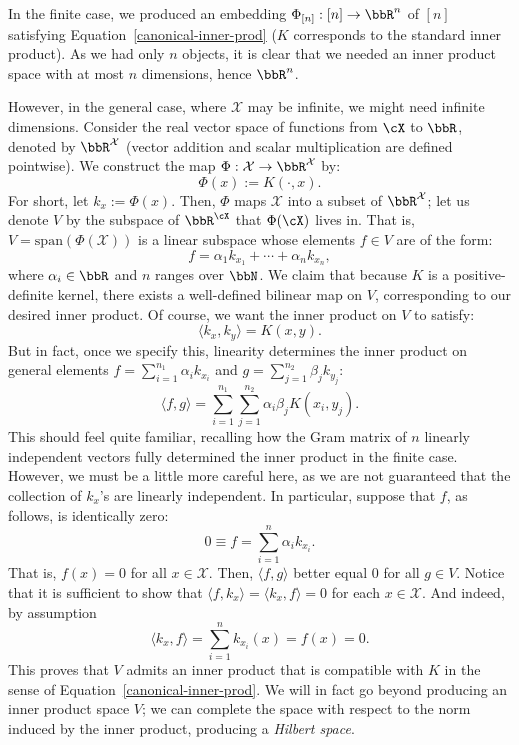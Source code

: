 \documentclass[twoside,11pt]{homework}
\begin{document}
\begin{multicols}{2}
In the finite case, we produced an embedding $\Phi_{[n]} : [n] \to \bbR^n$ of $[n]$
satisfying Equation~\ref{canonical-inner-prod} ($K$ corresponds to the standard
inner product). As we had only $n$ objects, it is clear that we needed an inner
product space with at most $n$ dimensions, hence $\bbR^n$.

However, in the general case, where $\mathcal{X}$ may be infinite, we might need
infinite dimensions. Consider the real vector space of functions from $\cX$ to $\bbR$,
denoted by $\bbR^\mathcal{X}$ (vector addition
and scalar multiplication are defined pointwise). We construct the map
$\Phi: \mathcal{X} \to \bbR^\mathcal{X}$ by:
\[\Phi(x) :=K(\cdot, x).\]
For short, let $k_x := \Phi(x)$. Then, $\Phi$ maps $\mathcal{X}$ into a subset of
$\bbR^\mathcal{X}$; let us denote $V$ by the subspace of $\bbR^\cX$ that $\Phi(\cX)$
lives in. That is, $V = \mathrm{span}(\Phi(\mathcal{X}))$ is a linear subspace
whose elements $f \in V$ are of the form:
\[f= \alpha_1k_{x_1} + \dotsm + \alpha_n k_{x_n},\]
where $\alpha_i \in \bbR$ and $n$ ranges over $\bbN$. We claim that because $K$ is a positive-definite kernel, there exists a well-defined bilinear map on $V$, corresponding to our desired inner product. Of course, we want the inner product on $V$ to satisfy:
\[\langle k_x, k_y\rangle = K(x,y).\]
But in fact, once we specify this, linearity determines the inner product on general elements $f = \sum_{i=1}^{n_1} \alpha_i k_{x_i}$ and $g = \sum_{j=1}^{n_2} \beta_j k_{y_j}$:
\[\langle f, g \rangle = \sum_{i=1}^{n_1} \sum_{j=1}^{n_2} \alpha_i \beta_j K(x_i, y_j).\]
This should feel quite familiar, recalling how the Gram matrix of $n$ linearly independent vectors fully determined the inner product in the finite case. However, we must be a little more careful here, as we are not guaranteed that the collection of $k_x$'s are linearly independent. In particular, suppose that $f$, as follows, is identically zero:
\[0 \equiv f = \sum_{i=1}^n \alpha_i k_{x_i}.\]
That is, $f(x) = 0$ for all $x \in \mathcal{X}$. Then, $\langle f, g\rangle$ better equal 0 for all $g \in V$. Notice that it is sufficient to show that $\langle f, k_x\rangle = \langle k_x , f\rangle = 0$ for each $x \in \mathcal{X}$. And indeed, by assumption
\[\langle k_x, f\rangle = \sum_{i=1}^n k_{x_i}(x) = f(x) = 0.\]
This proves that $V$ admits an inner product that is compatible with $K$ in the sense of Equation~\ref{canonical-inner-prod}. We will in fact go beyond producing an inner product space $V$; we can complete the space with respect to the norm induced by the inner product, producing a \emph{Hilbert space}.


\end{multicols}
\end{document}
